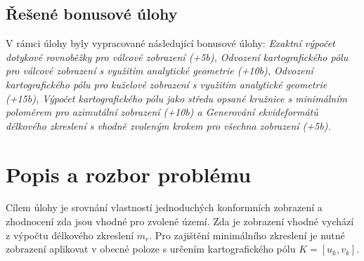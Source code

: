 \documentclass[12pt, a4paper]{article}
\begin{document}
\begin{center}
\end{center}
\vspace{1.5cm}

\subsection*{Řešené bonusové úlohy}
V rámci úlohy byly vypracované následující bonusové úlohy: \textit{Exaktní výpočet dotykové rovnoběžky pro válcové zobrazení (+5b), Odvození kartografického pólu pro válcové zobrazení s využitím analytické geometrie (+10b), Odvození kartografického pólu pro kuželové zobrazení s využitím analytické geometrie (+15b), Výpočet kartografického pólu jako středu opsané kružnice s minimálním poloměrem pro azimutální zobrazení (+10b) a Generování ekvideformátů délkového zkreslení s vhodně zvoleným krokem pro všechna zobrazení (+5b).}

\newpage
\section{Popis a rozbor problému}
Cílem úlohy je srovnání vlastností jednoduchých konformních zobrazení a zhodnocení zda jsou vhodné pro zvolené území. Zda je zobrazení vhodné vychází z výpočtu délkového zkreslení $m_r$. Pro zajištění minimálního zkreslení je nutné zobrazení aplikovat v obecné poloze s určením kartografického pólu $K = [u_k, v_k]$.
\vspace{3mm}
\end{document}
